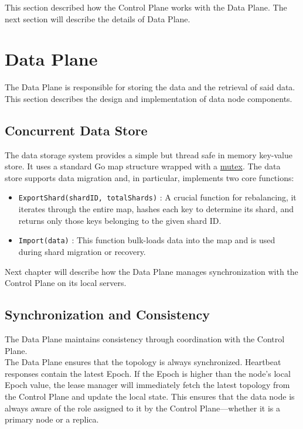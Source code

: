 \documentclass[shortabstract]{iithesis}
\begin{document}
This section described how the Control Plane works with the Data Plane. The next section will describe the details of Data Plane.

\section{Data Plane}
The Data Plane is responsible for storing the data and the retrieval of said data. This section describes the design and implementation of data node components.

\subsection{Concurrent Data Store}

The data storage system provides a simple but thread safe in memory key-value store. It uses a standard Go map structure wrapped with a \hyperref[def:mutex]{mutex}. The data store supports data migration and, in particular, implements two core functions:
\begin{itemize}
    \item [1.] \texttt{ExportShard(shardID, totalShards)} \label{func:exportshard}: A crucial function for rebalancing, it iterates through the entire map, hashes each key to determine its shard, and returns only those keys belonging to the given shard ID.
    \item [2.] \texttt{Import(data)} \label{func:import}: This function bulk-loads data into the map and is used during shard migration or recovery.
\end{itemize}

Next chapter will describe how the Data Plane manages synchronization with the Control Plane on its local servers.

\subsection{Synchronization and Consistency}

The Data Plane maintains consistency through coordination with the Control Plane. \\

The Data Plane ensures that the topology is always synchronized. Heartbeat responses contain the latest Epoch. If the Epoch is higher than the node's local Epoch value, the lease manager will immediately fetch the latest topology from the Control Plane and update the local state. This ensures that the data node is always aware of the role assigned to it by the Control Plane—whether it is a primary node or a replica.\\
\end{document}
